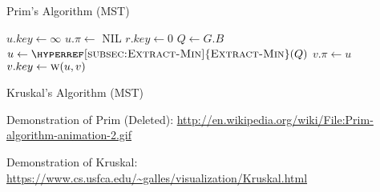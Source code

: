 \documentclass[26]{cs430lecture}
\begin{document}
\begin{newanswer}
	\begin{minipage}{0.5\textwidth}
		\begin{algorithm}[H]
			\caption{Prim's Algorithm (MST)}\label{alg:mst-prim}
			\begin{algorithmic}[1]
						\State $u.key\gets\infty$
						\State $u.\pi \gets $ NIL
					\EndFor
					\State $r.key\gets0$
					\State $Q\gets G.B$
						\State $u\gets\Call{\hyperref[subsec:Extract-Min]{Extract-Min}}{Q}$
								\State $v.\pi\gets u$
								\State $v.key\gets \Call{w}{u,v}$
							\EndIf
						\EndFor
					\EndWhile
				\EndFunction
			\end{algorithmic}
		\end{algorithm}
	\end{minipage}%
	\begin{minipage}{0.5\textwidth}
		\begin{algorithm}[H]
			\caption{Kruskal's Algorithm (MST)}\label{alg:mst-kruskal}
			\begin{algorithmic}[1]
				\State
				\EndFunction
			\end{algorithmic}
		\end{algorithm}\end{minipage}
\end{newanswer}

Demonstration of Prim (Deleted): \url{http://en.wikipedia.org/wiki/File:Prim-algorithm-animation-2.gif}

Demonstration of Kruskal: \url{https://www.cs.usfca.edu/~galles/visualization/Kruskal.html}
\end{document}
